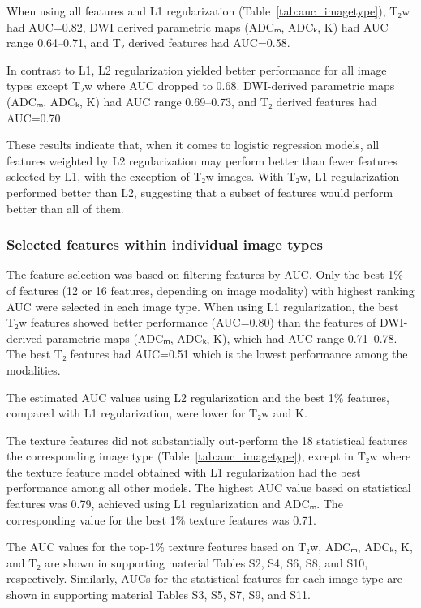 When using all features and L1 regularization (Table~\ref{tab:auc_imagetype}),
T₂w had AUC=0.82, DWI derived parametric maps (ADCₘ, ADCₖ, K) had AUC range
0.64--0.71, and T₂ derived features had AUC=0.58.

In contrast to L1, L2 regularization yielded better performance for all image
types except T₂w where AUC dropped to 0.68. DWI-derived parametric maps (ADCₘ,
ADCₖ, K) had AUC range 0.69--0.73, and T₂ derived features had AUC=0.70.

These results indicate that, when it comes to logistic regression models, all
features weighted by L2 regularization may perform better than fewer features
selected by L1, with the exception of T₂w images. With T₂w, L1 regularization
performed better than L2, suggesting that a subset of features would perform
better than all of them.


\subsubsection{Selected features within individual image types}

The feature selection was based on filtering features by AUC\@. Only the best
1\% of features (12 or 16 features, depending on image modality) with highest
ranking AUC were selected in each image type. When using L1 regularization, the
best T₂w features showed better performance (AUC=0.80) than the features of
DWI-derived parametric maps (ADCₘ, ADCₖ, K), which had AUC range 0.71--0.78. The
best T₂ features had AUC=0.51 which is the lowest performance among the
modalities.

The estimated AUC values using L2 regularization and the best 1\% features,
compared with L1 regularization, were lower for T₂w and K.

The texture features did not substantially out-perform the 18 statistical
features the corresponding image type (Table~\ref{tab:auc_imagetype}), except in
T₂w where the texture feature model obtained with L1 regularization had the best
performance among all other models. The highest AUC value based on statistical
features was 0.79, achieved using L1 regularization and ADCₘ. The corresponding
value for the best 1\% texture features was 0.71.

The AUC values for the top-1\% texture features based on T₂w, ADCₘ, ADCₖ, K,
and T₂ are shown in supporting material Tables S2, S4, S6, S8, and S10,
respectively. Similarly, AUCs for the statistical features for each image
type are shown in supporting material Tables S3, S5, S7, S9, and S11.



